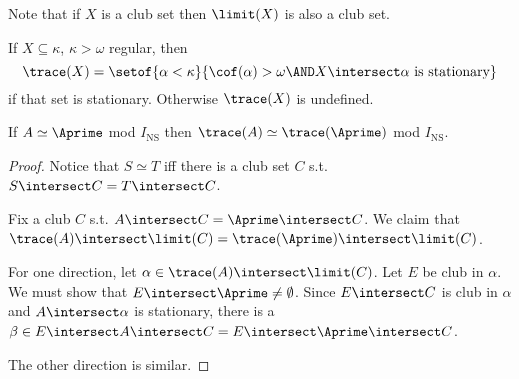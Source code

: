 \documentclass[oneside,12pt]{amsart}
\begin{document}
Note that if $X$ is a club set then $\limit(X)$ is also a club set.

\begin{definition}
If $X\subseteq \kappa$, $\kappa > \omega$ regular, then
$$\trace(X) = \setof{\alpha<\kappa}{\cof(\alpha) > \omega \AND X\intersect\alpha \text{ is stationary}}$$
if that set is stationary. Otherwise $\trace(X)$ is undefined.
\end{definition}


\begin{lemma}
\label{SimilarTraceLemma}
If $A\simeq \Aprime$ mod $I_{\text{NS}}$ then
$\trace(A) \simeq \trace(\Aprime)$ mod $I_{\text{NS}}$.
\end{lemma}
\begin{proof}
Notice that $S\simeq T$ iff there is a club set $C$ s.t. $S\intersect C = T\intersect C$.

Fix a club $C$ s.t. $A\intersect C = \Aprime\intersect C$.
We claim that $\trace(A) \intersect \limit(C) = \trace(\Aprime) \intersect \limit(C)$.

For one direction, let $\alpha\in\trace(A)\intersect \limit(C)$. Let $E$ be club in $\alpha$.
We must show that $E\intersect \Aprime \not= \emptyset$. Since $E\intersect C$
is club in $\alpha$ and $A\intersect\alpha$ is stationary,
there is a $\beta\in  E \intersect A\intersect C =  E \intersect \Aprime\intersect C$.

The other direction is similar.

\end{proof}
\end{document}

